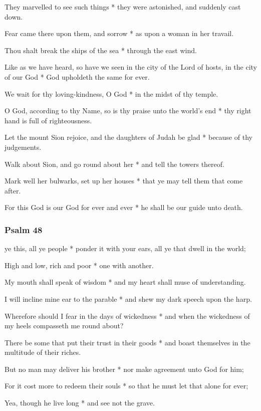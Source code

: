 They marvelled to see such things * they were astonished, and suddenly cast down.

Fear came there upon them, and sorrow * as upon a woman in her travail.

Thou shalt break the ships of the sea * through the east wind.

Like as we have heard, so have we seen in the city of the Lord of hosts, in the city of our God * God upholdeth the same for ever.

We wait for thy loving-kindness, O God * in the midst of thy temple.

O God, according to thy Name, so is thy praise unto the world's end * thy right hand is full of righteousness.

Let the mount Sion rejoice, and the daughters of Judah be glad * because of thy judgements.

Walk about Sion, and go round about her * and tell the towers thereof.

Mark well her bulwarks, set up her houses * that ye may tell them that come after.

For this God is our God for ever and ever * he shall be our guide unto death.

\subsubsection{Psalm 48}


 ye this, all ye people * ponder it with your ears, all ye that dwell in the world;

High and low, rich and poor * one with another.

My mouth shall speak of wisdom * and my heart shall muse of understanding.

I will incline mine ear to the parable * and shew my dark speech upon the harp.

Wherefore should I fear in the days of wickedness * and when the wickedness of my heels compasseth me round about?

There be some that put their trust in their goods * and boast themselves in the multitude of their riches.

But no man may deliver his brother * nor make agreement unto God for him;

For it cost more to redeem their souls * so that he must let that alone for ever;

Yea, though he live long * and see not the grave.

